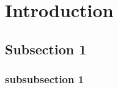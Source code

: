 \section{Introduction}

\lipsum

\subsection{Subsection 1}
\lipsum
\lipsum
\subsubsection{subsubsection 1}
\lipsum
\lipsum